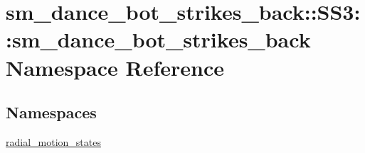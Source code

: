 \hypertarget{namespacesm__dance__bot__strikes__back_1_1SS3_1_1sm__dance__bot__strikes__back}{}\section{sm\+\_\+dance\+\_\+bot\+\_\+strikes\+\_\+back\+:\+:S\+S3\+:\+:sm\+\_\+dance\+\_\+bot\+\_\+strikes\+\_\+back Namespace Reference}
\label{namespacesm__dance__bot__strikes__back_1_1SS3_1_1sm__dance__bot__strikes__back}
\subsection*{Namespaces}
\begin{DoxyCompactItemize}
\item 
 \hyperlink{namespacesm__dance__bot__strikes__back_1_1SS3_1_1sm__dance__bot__strikes__back_1_1radial__motion__states}{radial\+\_\+motion\+\_\+states}
\end{DoxyCompactItemize}

